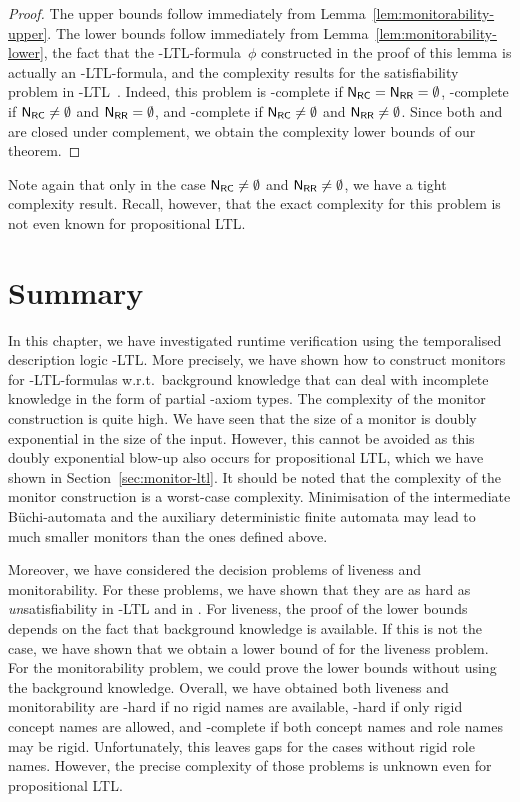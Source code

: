\begin{proof}
    The upper bounds follow immediately from
    Lemma~\ref{lem:monitorability-upper}.
    The lower bounds follow immediately from
    Lemma~\ref{lem:monitorability-lower}, the fact that the
    \SHOQ-LTL-formula~$\phi$ constructed in the proof of this lemma is actually
    an \ALC-LTL-formula, and the complexity results for the satisfiability
    problem in \ALC-LTL~\cite{BaGL-ToCL12}.  Indeed, this problem is
    \ExpTime-complete if $\mathsf{N_{RC}}=\mathsf{N_{RR}}=\emptyset$, \NExpTime-complete if
    $\mathsf{N_{RC}}\ne\emptyset$ and $\mathsf{N_{RR}}=\emptyset$, and \TwoExpTime-complete if
    $\mathsf{N_{RC}}\ne\emptyset$ and $\mathsf{N_{RR}}\ne\emptyset$.  Since both \ExpTime and
    \TwoExpTime are closed under complement, we obtain the complexity lower
    bounds of our theorem.
\end{proof}

\noindent
Note again that only in the case $\mathsf{N_{RC}}\ne\emptyset$ and $\mathsf{N_{RR}}\ne\emptyset$, we
have a tight complexity result.  Recall, however, that the exact complexity for
this problem is not even known for propositional LTL\@.


\section{Summary}\label{sec:monitor-summary}

In this chapter, we have investigated runtime verification using the temporalised
description logic \SHOQ-LTL\@.  More precisely, we have shown how to construct
monitors for \SHOQ-LTL-formulas w.r.t.\ background knowledge that can deal with
incomplete knowledge in the form of partial \SHOQ-axiom types.
%
The complexity of the monitor construction is quite high.  We have seen that the
size of a monitor is doubly exponential in the size of the input.  However, this
cannot be avoided as this doubly exponential blow-up also occurs for
propositional LTL, which we have shown in Section~\ref{sec:monitor-ltl}.
%
It should be noted that the complexity of the monitor construction is a
worst-case complexity.  Minimisation of the intermediate Büchi-automata and the
auxiliary deterministic finite automata may lead to much smaller monitors than
the ones defined above.

Moreover, we have considered the decision problems of liveness and
monitorability.  For these problems, we have shown that they are as hard as
\emph{un}satisfiability in \ALC-LTL and in \TwoExpTime.  For liveness, the proof
of the lower bounds depends on the fact that background knowledge is available.
If this is not the case, we have shown that we obtain a lower bound of \ExpTime
for the liveness problem.  For the monitorability problem, we could prove the
lower bounds without using the background knowledge.  Overall, we have obtained
both liveness and monitorability are \ExpTime-hard if no rigid names are
available, \coNExpTime-hard if only rigid concept names are allowed, and
\TwoExpTime-complete if both concept names and role names may be rigid.
%
Unfortunately, this leaves gaps for the cases without rigid role names.
However, the precise complexity of those problems is unknown even for
propositional LTL\@.

